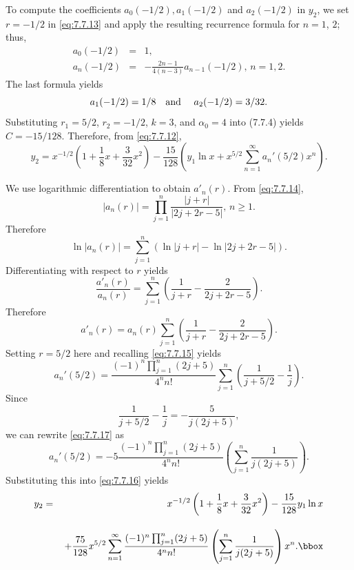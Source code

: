 \begin{examplesolution}
To compute the coefficients $a_{0}(-1/2),a_{1}(-1/2)$ and $a_{2}(-1/2)$ in $y_{2}$, we set $r=-1/2$
in \eqref{eq:7.7.13} and apply the resulting recurrence formula for $n=1$, $2$; thus,
\begin{eqnarray*}
  a_{0}(-1/2) & = & 1, \\
  a_{n}(-1/2) & = & -\frac{2n-1}{4(n-3)}a_{n-1}(-1/2),\,n=1,2.
\end{eqnarray*}
The last formula yields
\[
  a_{1}(-1/2)=1/8\text{\quad and \quad}a_{2}(-1/2)=3/32.
\]
Substituting $r_{1}=5/2$, $r_{2}=-1/2$, $k=3$, and $\alpha_{0}=4$ into \textup{(7.7.4)} yields
$C=-15/128$. Therefore, from \eqref{eq:7.7.12},
\begin{equation}
  \label{eq:7.7.16}y_{2}=x^{-1/2}\left(1+\frac{1}{8}x+\frac{3}{32}x^{2}\right) -\frac{15}{128}\left(y_{1}\ln x+x^{5/2}\sum_{n=1}^{\infty}a_{n}'(5/2)x^{n}\right).
\end{equation}

We use logarithmic differentiation to obtain $a'_{n}(r)$. From \eqref{eq:7.7.14},
\[
  |a_{n}(r)|=\prod_{j=1}^{n}\frac{|j+r|}{|2j+2r-5|},\,n\ge1.
\]
Therefore
\[
  \ln|a_{n}(r)|=\sum^{n}_{j=1}\left(\ln|j+r|-\ln|2j+2r-5|\right).
\]
Differentiating with respect to $r$ yields
\[
  \frac{a'_{n}(r)}{a_{n}(r)}=\sum^{n}_{j=1}\left(\frac{1}{j+r}-\frac{2}{2j+2r-5}\right).
\]
Therefore
\[
  a'_{n}(r)=a_{n}(r)\sum^{n}_{j=1}\left(\frac{1}{j+r}-\frac{2}{2j+2r-5}\right).
\]
Setting $r=5/2$ here and recalling \eqref{eq:7.7.15} yields
\begin{equation}
  \label{eq:7.7.17}a_{n}'(5/2)=\frac{(-1)^{n}\prod_{j=1}^{n}(2j+5)}{4^{n}n!}\sum_{j=1}^{n}\left(\frac{1}{j+5/2}-\frac{1}{j}\right).
\end{equation}
Since
\[
  \frac{1}{j+5/2}-\frac{1}{j}=-\frac{5}{j(2j+5)},
\]
we can rewrite \eqref{eq:7.7.17} as
\[
  a_{n}'(5/2)=-5{\frac{(-1)^{n}\prod_{j=1}^{n}(2j+5)}{4^{n}n!}}\left(\sum_{j=1}^{n}\frac{1}{j(2j+5)}\right).
\]
Substituting this into \eqref{eq:7.7.16} yields
\begin{eqnarray*}
  y_{2} & = & x^{-1/2}\left(1+\frac{1}{8}x+\frac{3}{32}x^{2}\right)-\frac{15}{128}y_{1}\ln x \\[10pt]
        &   & \,+\frac{75}{128}x^{5/2}\sum_{n=1}^{\infty}\frac{(-1)^{n}\prod_{j=1}^{n}(2j+5)}{4^{n}n!}\left(\sum_{j=1}^{n}\frac{1}{j(2j+5)}\right)x^{n}.\bbox
\end{eqnarray*}
\end{examplesolution}

